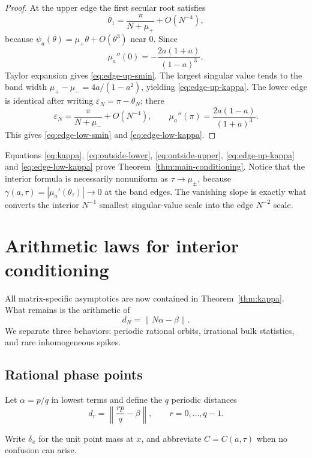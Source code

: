 \documentclass[11pt,reqno]{amsart}
\theoremstyle{plain}
\theoremstyle{definition}
\newcommand{\norm}[1]{\left\lVert #1\right\rVert}
\begin{document}
\begin{proof}
At the upper edge the first secular root satisfies
\[
\theta_1=\frac{\pi}{N+\mu_+}+O(N^{-4}),
\]
because $\psi_a(\theta)=\mu_+\theta+O(\theta^3)$ near $0$.  Since
\[
\mu_a''(0)=-\frac{2a(1+a)}{(1-a)^3},
\]
Taylor expansion gives \eqref{eq:edge-up-smin}.  The largest singular value tends to
the band width $\mu_+-\mu_-=4a/(1-a^2)$, yielding
\eqref{eq:edge-up-kappa}.  The lower edge is identical after writing
$\varepsilon_N=\pi-\theta_N$; there
\[
\varepsilon_N=\frac{\pi}{N+\mu_-}+O(N^{-4}),
\qquad
\mu_a''(\pi)=\frac{2a(1-a)}{(1+a)^3}.
\]
This gives \eqref{eq:edge-low-smin} and \eqref{eq:edge-low-kappa}.
\end{proof}

Equations \eqref{eq:kappa}, \eqref{eq:outside-lower},
\eqref{eq:outside-upper}, \eqref{eq:edge-up-kappa} and
\eqref{eq:edge-low-kappa} prove Theorem~\ref{thm:main-conditioning}.
Notice that the interior formula is necessarily nonuniform as
$\tau\to\mu_\pm$, because $\gamma(a,\tau)=|\mu_a'(\theta_\tau)|\to0$ at the band
edges.  The vanishing slope is exactly what converts the interior $N^{-1}$ smallest
singular-value scale into the edge $N^{-2}$ scale.

\section{Arithmetic laws for interior conditioning}\label{sec:dioph}

All matrix-specific asymptotics are now contained in Theorem~\ref{thm:kappa}.
What remains is the arithmetic of
\[
d_N=\norm{N\alpha-\beta}.
\]
We separate three behaviors: periodic rational orbits, irrational bulk statistics,
and rare inhomogeneous spikes.

\subsection{Rational phase points}

Let $\alpha=p/q$ in lowest terms and define the $q$ periodic distances
\begin{equation}\label{eq:dr}
d_r=\norm{\frac{rp}{q}-\beta},
\qquad r=0,\ldots,q-1.
\end{equation}

Write $\delta_x$ for the unit point mass at $x$, and abbreviate $C=C(a,\tau)$ when no confusion can arise.
\end{document}
